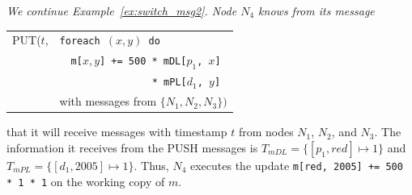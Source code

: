 \begin{example}\em
\label{ex:switch_msg3}
We continue Example~\ref{ex:switch_msg2}.
Node $N_4$ knows from its message
\begin{center}
\begin{tabular}{ll}
PUT($t$,   & {\tt foreach $(x,y)$ do} \\
           & ~~{\tt m[$x,y$] += 500 * mDL[$p_1$, $x$]} \\
           & ~~{\tt ~~~~~~~~~~~~~ * mPL[$d_1$, $y$]} \\
           & with messages from $\{N_1, N_2, N_3\})$
\end{tabular}
\end{center}
that it will receive messages with timestamp $t$ from nodes $N_1$, $N_2$, and
$N_3$.
The information it receives from the PUSH messages is
$T_{mDL} = \{ [p_1, red] \mapsto 1 \}$ and
$T_{mPL} = \{ [d_1, 2005] \mapsto 1 \}$.
Thus, $N_4$ executes the update
{\tt m[red, 2005] += 500 * 1 * 1}
on the working copy of $m$. 
\punto
\end{example}

